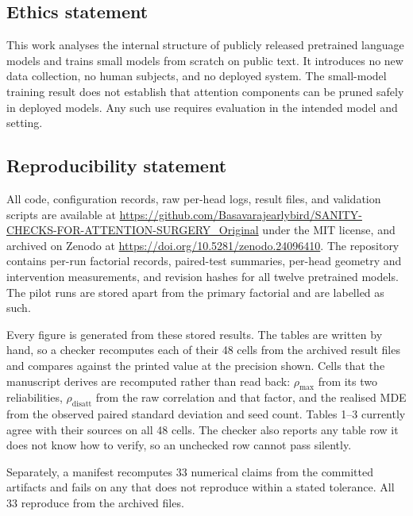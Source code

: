 \documentclass{article} %
\begin{document}
\subsection*{Ethics statement}

This work analyses the internal structure of publicly released pretrained
language models and trains small models from scratch on public text. It
introduces no new data collection, no human subjects, and no deployed system.
The small-model training result does not establish that attention components
can be pruned safely in deployed models. Any such use requires evaluation in
the intended model and setting.

\subsection*{Reproducibility statement}

All code, configuration records, raw per-head logs, result files, and
validation scripts are available at \url{https://github.com/Basavarajearlybird/SANITY-CHECKS-FOR-ATTENTION-SURGERY_Original} under the MIT license, and
archived on Zenodo at \url{https://doi.org/10.5281/zenodo.24096410}.
The repository contains per-run factorial records, paired-test summaries,
per-head geometry and intervention measurements, and revision hashes for all
twelve pretrained models. The pilot runs are stored apart from the primary
factorial and are labelled as such.

Every figure is generated from these stored results. The tables are written by
hand, so a checker recomputes each of their 48 cells from the archived result
files and compares against the printed value at the precision shown. Cells
that the manuscript derives are recomputed rather than read back:
$\rho_{\max}$ from its two reliabilities, $\rho_{\text{disatt}}$ from the raw
correlation and that factor, and the realised MDE from the observed paired
standard deviation and seed count. Tables 1--3 currently agree with their
sources on all 48 cells. The checker also reports any table row it does not
know how to verify, so an unchecked row cannot pass silently.

Separately, a manifest recomputes 33 numerical claims from the committed
artifacts and fails on any that does not reproduce within a stated tolerance.
All 33 reproduce from the archived files.




\clearpage
\appendix
\end{document}
